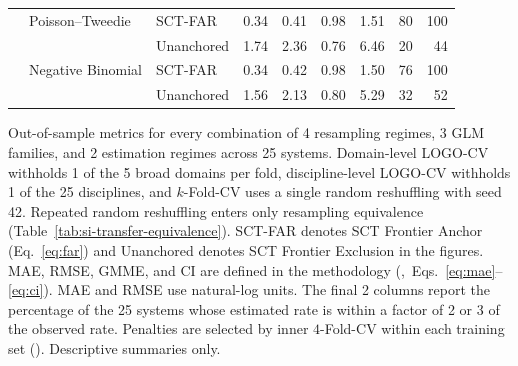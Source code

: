 \documentclass{article}
\begin{document}
\begin{table}[H]
\begin{tabularx}{\linewidth}{@{}lXlrrrrrr@{}}
 & Poisson--Tweedie & SCT-FAR & 0.34 & 0.41 & 0.98 & 1.51 & 80 & 100 \\
 &  & Unanchored & 1.74 & 2.36 & 0.76 & 6.46 & 20 & 44 \\
 & Negative Binomial & SCT-FAR & 0.34 & 0.42 & 0.98 & 1.50 & 76 & 100 \\
 &  & Unanchored & 1.56 & 2.13 & 0.80 & 5.29 & 32 & 52 \\
\bottomrule
\end{tabularx}
\par\vspace{12pt}
\begin{minipage}{\linewidth}
\footnotesize
Out-of-sample metrics for every combination of 4 resampling regimes, 3 GLM families, and 2 estimation regimes across 25 systems. Domain-level LOGO-CV withholds 1 of the 5 broad domains per fold, discipline-level LOGO-CV withholds 1 of the 25 disciplines, and $k$-Fold-CV uses a single random reshuffling with seed 42. Repeated random reshuffling enters only resampling equivalence (Table~\ref{tab:si-transfer-equivalence}). SCT-FAR denotes SCT Frontier Anchor (Eq.~\eqref{eq:far}) and Unanchored denotes SCT Frontier Exclusion in the figures. MAE, RMSE, GMME, and CI are defined in the methodology (,~Eqs.~\eqref{eq:mae}--\eqref{eq:ci}). MAE and RMSE use natural-log units. The final 2 columns report the percentage of the 25 systems whose estimated rate is within a factor of 2 or 3 of the observed rate. Penalties are selected by inner $4$-Fold-CV within each training set (). Descriptive summaries only.
\end{minipage}
\end{table}
\end{document}
